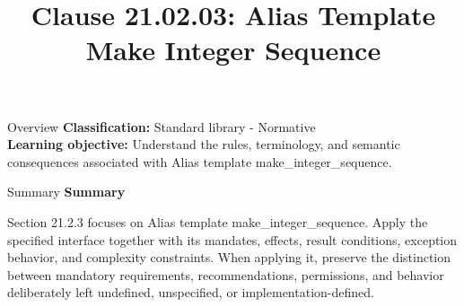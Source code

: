 \documentclass[10pt,letterpaper]{article}
\title{Clause 21.02.03: Alias Template Make Integer Sequence}
\author{}
\date{}
\begin{document}
\maketitle
\begin{CornellOverviewBox}{Overview}
\textbf{Classification:} Standard library - Normative\\[2pt]
\textbf{Learning objective:} Understand the rules, terminology, and semantic consequences associated with Alias template make\_integer\_sequence.
\end{CornellOverviewBox}\begin{CornellSummaryBox}{Summary}
{\sffamily\bfseries\color{Accent} Summary}\par\vspace{3pt}Section 21.2.3 focuses on Alias template make\_integer\_sequence. Apply the specified interface together with its mandates, effects, result conditions, exception behavior, and complexity constraints. When applying it, preserve the distinction between mandatory requirements, recommendations, permissions, and behavior deliberately left undefined, unspecified, or implementation-defined.
\end{CornellSummaryBox}
\end{document}
